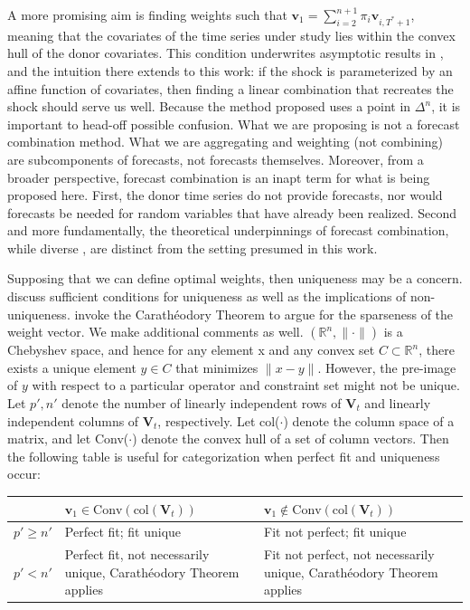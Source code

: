 \documentclass[11pt,3p,review,authoryear]{elsarticle}
\newcommand{\weight}{\pi}
\newcommand{\V}{\textbf{V}}
\theoremstyle{definition}
\begin{document}
A more promising aim is finding weights such that $\textbf{v}_{1} = \sum^{n+1}_{i=2}\weight_{i}\textbf{v}_{i,T^{*}+1}$, meaning that the covariates of the time series under study lies within the convex hull of the donor covariates.  This condition underwrites asymptotic results in \citet{abadie2010synthetic}, and the intuition there extends to this work: if the shock is parameterized by an affine function of covariates, then finding a linear combination that recreates the shock should serve us well.  Because the method proposed uses a point in $\Delta^{n}$, it is important to head-off possible confusion.  What we are proposing is not a forecast combination method.  What we are aggregating and weighting (not combining) are subcomponents of forecasts, not forecasts themselves.  Moreover, from a broader perspective, forecast combination is an inapt term for what is being proposed here.  First, the donor time series do not provide forecasts, nor would forecasts be needed for random variables that have already been realized.  Second and more fundamentally, the theoretical underpinnings of forecast combination, while diverse \citep{wang2023forecast}, are distinct from the setting presumed in this work.

Supposing that we can define optimal weights, then uniqueness may be a concern. \cite{lin2021minimizing} discuss sufficient conditions for uniqueness as well as the implications of non-uniqueness.  \cite{abadie2022synthetic} invoke the Carath\'eodory Theorem to argue for the sparseness of the weight vector.  We make additional comments as well. $(\mathbb{R}^{n}, \|\cdot\|)$ is a Chebyshev space, and hence for any element x and any convex set $C\subset \mathbb{R}^{n}$, there exists a unique element $y\in C$ that minimizes $\|x-y\|$.  However, the pre-image of $y$ with respect to a particular operator and constraint set might not be unique.  Let $p', n'$ denote the number of linearly independent rows of $\V_{t}$ and linearly independent columns of $\V_{t}$, respectively.  Let col($\cdot$) denote the column space of a matrix, and let Conv($\cdot$) denote the convex hull of a set of column vectors. Then the following table is useful for categorization when perfect fit and uniqueness occur: \\

    \begin{center}
      \begin{tabular}{ | m{3em} | m{7cm}| m{7cm} | } 
        \hline
        & $\textbf{v}_{1}\in \text{Conv}(\text{col}(\V_{t}))$ & $\textbf{v}_{1} \notin \text{Conv}(\text{col}(\V_{t}))$\\ 
        \hline
        $p' \geq n'$ & Perfect fit; fit unique & Fit not perfect; fit unique \\
        \hline
        $p' < n'$ & Perfect fit, not necessarily unique, Carath\'eodory Theorem applies& Fit not perfect, not necessarily unique, Carath\'eodory Theorem applies \\ 
        \hline
      \end{tabular}
      \end{center} 
\end{document}
